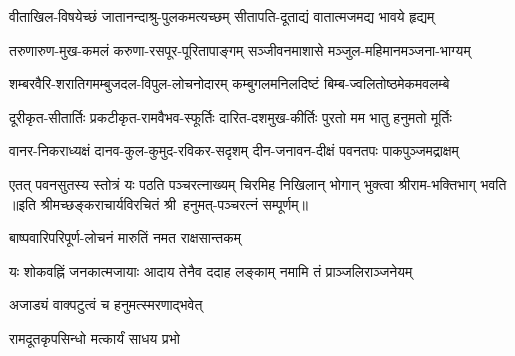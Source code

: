 
\twolineshloka
{वीताखिल-विषयेच्छं जातानन्दाश्रु-पुलकमत्यच्छम्}
{सीतापति-दूताद्यं वातात्मजमद्य भावये हृद्यम्}

\twolineshloka
{तरुणारुण-मुख-कमलं करुणा-रसपूर-पूरितापाङ्गम्}
{सञ्जीवनमाशासे मञ्जुल-महिमानमञ्जना-भाग्यम्}

\twolineshloka
{शम्बरवैरि-शरातिगमम्बुजदल-विपुल-लोचनोदारम्}
{कम्बुगलमनिलदिष्टं बिम्ब-ज्वलितोष्ठमेकमवलम्बे}

\twolineshloka
{दूरीकृत-सीतार्तिः प्रकटीकृत-रामवैभव-स्फूर्तिः}
{दारित-दशमुख-कीर्तिः पुरतो मम भातु हनुमतो मूर्तिः}

\twolineshloka
{वानर-निकराध्यक्षं दानव-कुल-कुमुद-रविकर-सदृशम्}
{दीन-जनावन-दीक्षं पवनतपः पाकपुञ्जमद्राक्षम्}

\twolineshloka
{एतत् पवनसुतस्य स्तोत्रं यः पठति पञ्चरत्नाख्यम्}
{चिरमिह निखिलान् भोगान् भुक्त्वा श्रीराम-भक्तिभाग् भवति}
॥इति श्रीमच्छङ्कराचार्यविरचितं श्री~हनुमत्-पञ्चरत्नं सम्पूर्णम्॥

{बाष्पवारिपरिपूर्ण-लोचनं मारुतिं नमत राक्षसान्तकम्‌}

{यः शोकवह्निं जनकात्मजायाः}
{आदाय तेनैव ददाह लङ्काम्}
{नमामि तं प्राञ्जलिराञ्जनेयम्}

{अजाड्यं वाक्पटुत्वं च हनुमत्स्मरणाद्भवेत्}

{रामदूतकृपसिन्धो मत्कार्यं साधय प्रभो}

